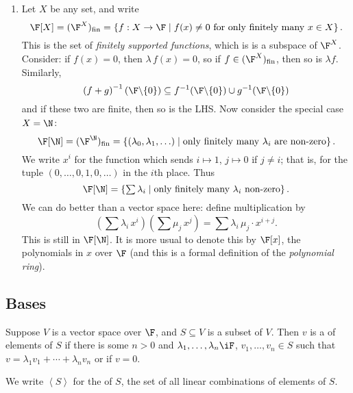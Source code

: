 \begin{examples}
\begin{enumerate}
		\item Let $X$ be any set, and write
		\begin{equation*}
			\F[X]
			=(\F^X)_\text{fin}
			= \left\{f:X\to \F\mid f(x)\neq 0 \text{ for only finitely many } x \in X\right\}. %
		\end{equation*}
		This is the set of \emph{finitely supported functions}, which is is a subspace of $\F^X$. Consider: if $f(x)=0$, then $\lambda\,f(x)=0$, so if $f\in(\F^X)_\text{fin}$, then so is $\lambda f$. Similarly,
		\begin{equation*}
			\left( f+g \right)^{-1}(\F\backslash\{0\}) \subseteq f^{-1}(\F\backslash\{0\}) \cup g^{-1}(\F\backslash\{0\}) %
		\end{equation*}
		and if these two are finite, then so is the LHS. Now consider the special case $X=\N$:
		\begin{equation*}
			\F[\N] = (\F^\N)_\text{fin}
			= \left\{ (\lambda_0,\lambda_1,\ldots) \mid \text{only finitely many } \lambda_i \text{ are non-zero}\right\}. %
		\end{equation*}
		We write $x^i$ for the function which sends $i\mapsto 1$, $j\mapsto0$ if $j\neq i$; that is, for the tuple $(0,\ldots,0,1,0,\ldots)$ in the $i$th place. Thus %
		\begin{equation*}
			\textstyle \F[\N] = \left\{\sum \lambda_i \mid \text{only finitely many } \lambda_i \text{ non-zero}\right\}. %
		\end{equation*}
		We can do better than a vector space here: define multiplication by
		\begin{equation*}
			\textstyle \left( \sum \lambda_i \, x^i \right)
			\textstyle \left( \sum \mu_{j} \, x^{j} \right)
			\textstyle =  \sum \lambda_i \, \mu_{j} \cdot x^{i+j}.
		\end{equation*}
		This is still in $\F[\N]$. It is more usual to denote this by $\F[x]$, the polynomials in $x$ over $\F$ (and this is a formal definition of the \emph{polynomial ring}). %
	\end{enumerate} %
\end{examples}


\subsection{Bases} %
\label{sub:bases}

\begin{definition}
	Suppose $V$ is a vector space over $\F$, and $S\subseteq V$ is a subset of $V$. Then $v$ is a  of elements of $S$ if there is some $n>0$ and $\lambda_1,\ldots,\lambda_n\iF$, $v_1,\ldots,v_n\in S$ such that $v=\lambda_1 v_1 + \cdots + \lambda_n v_n$ or if $v=0$. %
	
	We write $\left\langle S \right\rangle$ for the  of $S$, the set of all linear combinations of elements of $S$. %
\end{definition}

